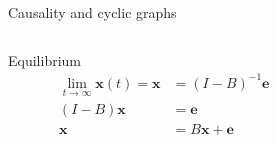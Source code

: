 \begin{frame}{Causality and cyclic graphs}
\begin{columns}
\begin{column}{0.65\textwidth}
Equilibrium
\begin{subequations}
\label{eq:eber_simple}
\begin{align}
\lim_{t \rightarrow \infty} \boldsymbol{x}(t) = \boldsymbol{x} &=
    \left( I - B \right)^{-1} \boldsymbol{e}
\\
\left( I - B \right) \boldsymbol{x} &=
    \boldsymbol{e}
\\
\boldsymbol{x} &=
    B \boldsymbol{x} + \boldsymbol{e}
\end{align}
\end{subequations}
\end{column}
\begin{column}{0.35\textwidth}
\begin{figure}[ht]
    \centering

\end{figure}
\end{column}
\end{columns}
\end{frame}
